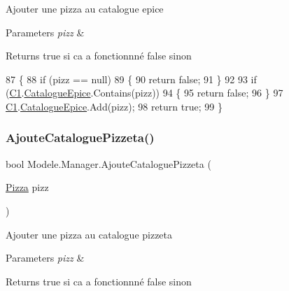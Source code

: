 Ajouter une pizza au catalogue epice 


\begin{DoxyParams}{Parameters}
{\em pizz} & \\
\hline
\end{DoxyParams}
\begin{DoxyReturn}{Returns}
true si ca a fonctionnné false sinon
\end{DoxyReturn}

\begin{DoxyCode}
87         \{
88             \textcolor{keywordflow}{if} (pizz == null)
89             \{
90                 \textcolor{keywordflow}{return} \textcolor{keyword}{false};
91             \}
92 
93             \textcolor{keywordflow}{if} (\hyperlink{classModele_1_1Manager_a54bbc7bd646fcaa0f1a590310dd3c02c}{C1}.\hyperlink{classModele_1_1Catalogue_a633610212f42551a5755212e21bedbca}{CatalogueEpice}.Contains(pizz))
94             \{
95                 \textcolor{keywordflow}{return} \textcolor{keyword}{false};
96             \}
97             \hyperlink{classModele_1_1Manager_a54bbc7bd646fcaa0f1a590310dd3c02c}{C1}.\hyperlink{classModele_1_1Catalogue_a633610212f42551a5755212e21bedbca}{CatalogueEpice}.Add(pizz);
98             \textcolor{keywordflow}{return} \textcolor{keyword}{true};
99         \}
\end{DoxyCode}
\mbox{\label{classModele_1_1Manager_a154dceeeebd915d9f132e056ce3f0753}} 
\subsubsection{\texorpdfstring{Ajoute\+Catalogue\+Pizzeta()}{AjouteCataloguePizzeta()}}
{\footnotesize\ttfamily bool Modele.\+Manager.\+Ajoute\+Catalogue\+Pizzeta (\begin{DoxyParamCaption}\item[{\hyperlink{classModele_1_1Pizza}{Pizza}}]{pizz }\end{DoxyParamCaption})\hspace{0.3cm}{\ttfamily [inline]}}



Ajouter une pizza au catalogue pizzeta 


\begin{DoxyParams}{Parameters}
{\em pizz} & \\
\hline
\end{DoxyParams}
\begin{DoxyReturn}{Returns}
true si ca a fonctionnné false sinon
\end{DoxyReturn}

